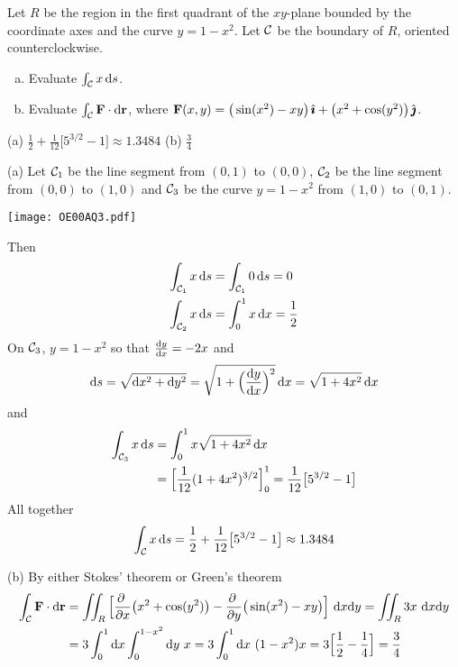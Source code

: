 \begin{question}[M317 2000A] %
Let $R$ be the region in the first quadrant of the $xy$-plane
bounded by the coordinate axes and the curve $y=1-x^2$. Let $\mathcal{C}$ be the
boundary of $R$, oriented counterclockwise.
\begin{enumerate}[(a)]
\item
Evaluate $\int_{\mathcal{C}} x\,\mathrm{d}s$.
\item
 Evaluate $\int_{\mathcal{C}} \mathbf{F}\cdot \mathrm{d}\mathbf{r}$, where $\mathbf{F}(x,y)
=\big(\sin(x^2)-xy\big)\,\hat{\pmb{\imath}}+\big(x^2+\cos(y^2)\big)\,\hat{\pmb{\jmath}}$.
\end{enumerate}
\end{question}


\begin{answer} 
(a) $\frac{1}{2}+\frac{1}{12}\big[5^{3/2}-1\big]\approx 1.3484$\qquad
(b) $\frac{3}{4}$
\end{answer}

\begin{solution} 
(a) Let $\mathcal{C}_1$ be the line segment from $(0,1)$ to $(0,0)$,
$\mathcal{C}_2$ be the line segment from $(0,0)$ to $(1,0)$ and
$\mathcal{C}_3$ be the curve $y=1-x^2$ from $(1,0)$ to $(0,1)$.

\begin{center}
   \texttt{[image: OE00AQ3.pdf]}
\end{center}


 Then
\begin{align*}
\int_{\mathcal{C}_1} x\,\mathrm{d}s&=\int_{\mathcal{C}_1} 0\,\mathrm{d}s=0\\
\int_{\mathcal{C}_2} x\,\mathrm{d}s&=\int_0^1 x\,\mathrm{d}x=\frac{1}{2}
\end{align*}
On $\mathcal{C}_3$, $y=1-x^2$ so that $\diff{y}{x}=-2x$ and
\begin{equation*}
\dee{s} =\sqrt{\dee{x}^2+\dee{y}^2}
        =\sqrt{1+\Big(\diff{y}{x}\Big)^2}\,\dee{x}
        =\sqrt{1+4x^2}\,\dee{x}
\end{equation*}
and
\begin{align*}
\int_{\cC_3} x\,\dee{s}
&%
=\int_0^1 x\sqrt{1+4x^2}\,\dee{x}\\
&=\Big[\frac{1}{12}(1+4x^2)^{3/2}\Big]_0^1
=\frac{1}{12}\big[5^{3/2}-1\big]
\end{align*}
All together
$$
\int_{\mathcal{C}} x\,\mathrm{d}s=\frac{1}{2}+\frac{1}{12}\big[5^{3/2}-1\big]
\approx 1.3484
$$

(b) By either Stokes' theorem or Green's theorem
\begin{align*}
\int_\cC \vF\cdot \dee{\vr}
&=\dblInt_R\Big[\pdiff{}{x}\big(x^2+\cos(y^2)\big)
-\pdiff{}{y}\big(\sin(x^2)-xy\big) \Big]\ \dee{x} \dee{y}
=\dblInt_R3x\ \dee{x} \dee{y}\\
&=3\int_0^1 \dee{x}\int_0^{1-x^2}\dee{y}\ x
=3\int_0^1 \dee{x}\ (1-x^2) x
=3\Big[\frac{1}{2}-\frac{1}{4}\Big]=\frac{3}{4}
\end{align*}
\end{solution}


